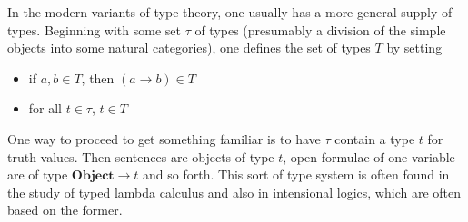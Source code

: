 \documentclass[12pt]{article}
\begin{document}
In the modern variants of type theory, one usually has a more general supply of types. Beginning with some set $\tau$ of types (presumably a division of the simple objects into some natural categories), one defines the set of types $T$ by setting

\begin{itemize}
 \item if $a,b \in T$, then $(a \rightarrow b) \in T$
 \item for all $t \in \tau$, $t \in T$
\end{itemize}

One way to proceed to get something familiar is to have $\tau$ contain a type $t$ for truth values. Then sentences are objects of type $t$, open formulae of one variable are of type $\mathbf{Object}\rightarrow t$ and so forth. This sort of type system is often found in the study of typed lambda calculus and also in intensional logics, which are often based on the former.
\end{document}
